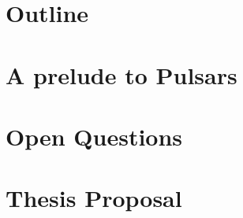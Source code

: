 \documentclass[a4paper,12pt]{article}
\begin{document}
\section{Outline}



\section{A prelude to Pulsars}





\section{Open Questions}


\section{Thesis Proposal}
\end{document}
